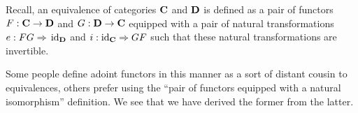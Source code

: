 Recall, an equivalence of categories $\mathbf{C}$ and $\mathbf{D}$ is
defined as a pair of functors $F:\mathbf{C}\to\mathbf{D}$ and
$G:\mathbf{D}\to\mathbf{C}$ equipped with a pair of natural
transformations $e:FG\Rightarrow{}\operatorname{id}_{\mathbf{D}}$ and
$i:\operatorname{id}_{\mathbf{C}}\Rightarrow{}GF$ such that these natural
transformations are invertible.

\begin{rmk}
Some people define adoint functors in this manner as a sort of
distant cousin to equivalences, others prefer using the ``pair of
functors equipped with a natural isomorphism'' definition. We see
that we have derived the former from the latter. 
\end{rmk}
